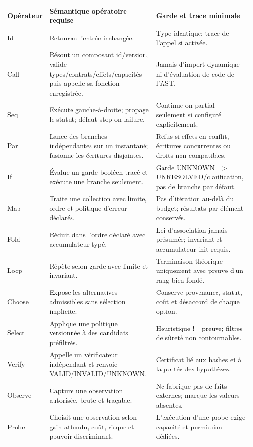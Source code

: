 \documentclass[10pt,a4paper]{article}
\begin{document}
\begin{longtable}{p{}p{}p{}}
\toprule Opérateur & Sémantique opératoire requise & Garde et trace minimale \\
\midrule
Id & Retourne l'entrée inchangée. & Type identique; trace de l'appel si activée. \\
Call & Résout un composant id/version, valide types/contrats/effets/capacités puis appelle sa fonction enregistrée. & Jamais d'import dynamique ni d'évaluation de code de l'AST. \\
Seq & Exécute gauche-à-droite; propage le statut; défaut stop-on-failure. & Continue-on-partial seulement si configuré explicitement. \\
Par & Lance des branches indépendantes sur un instantané; fusionne les écritures disjointes. & Refus si effets en conflit, écritures concurrentes ou droits non compatibles. \\
If & Évalue un garde booléen tracé et exécute une branche seulement. & Garde UNKNOWN => UNRESOLVED/clarification, pas de branche par défaut. \\
Map & Traite une collection avec limite, ordre et politique d'erreur déclarés. & Pas d'itération au-delà du budget; résultats par élément conservés. \\
Fold & Réduit dans l'ordre déclaré avec accumulateur typé. & Loi d'association jamais présumée; invariant et accumulateur init requis. \\
Loop & Répète selon garde avec limite et invariant. & Terminaison théorique uniquement avec preuve d'un rang bien fondé. \\
Choose & Expose les alternatives admissibles sans sélection implicite. & Conserve provenance, statut, coût et désaccord de chaque option. \\
Select & Applique une politique versionnée à des candidats préfiltrés. & Heuristique != preuve; filtres de sûreté non contournables. \\
Verify & Appelle un vérificateur indépendant et renvoie VALID/INVALID/UNKNOWN. & Certificat lié aux hashes et à la portée des hypothèses. \\
Observe & Capture une observation autorisée, brute et traçable. & Ne fabrique pas de faits externes; marque les valeurs absentes. \\
Probe & Choisit une observation selon gain attendu, coût, risque et pouvoir discriminant. & L'exécution d'une probe exige capacité et permission dédiées. \\

\end{longtable}
\end{document}
